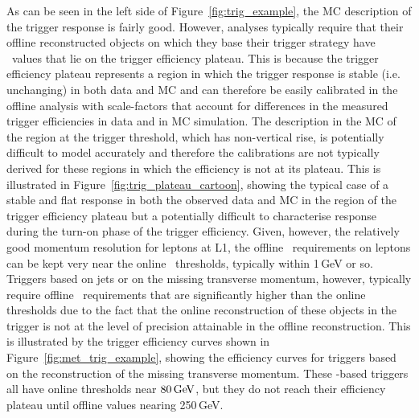 As can be seen in the left side of Figure~\ref{fig:trig_example}, the MC description of the trigger
response is fairly good.
However, analyses typically require that their offline reconstructed objects on which they base
their trigger strategy have \pT~values that lie on the trigger efficiency plateau.
This is because the trigger efficiency plateau represents a region in which the trigger response
is stable (i.e. unchanging) in both data and MC and can therefore be easily calibrated in the offline analysis
with scale-factors that account for differences in the measured trigger efficiencies in data and in MC simulation.
The description in the MC of the region at the trigger threshold, which has non-vertical rise,
is potentially difficult to model accurately and therefore the calibrations are not typically
derived for these regions in which the efficiency is not at its plateau.
This is illustrated in Figure~\ref{fig:trig_plateau_cartoon}, showing the typical case of a stable
and flat response in both the observed data and MC in the region of the trigger efficiency
plateau but a potentially difficult to characterise response during the turn-on phase of the trigger
efficiency.
Given, however, the relatively good momentum resolution for leptons at L1, the offline \pT~requirements on leptons
can be kept very near the online \pT~thresholds, typically within 1\,GeV or so.
Triggers based on jets or on the missing transverse momentum, however, typically require offline \pT~requirements
that are significantly higher than the online thresholds due to the fact that the online reconstruction of these
objects in the trigger is not at the level of precision attainable in the offline reconstruction.
This is illustrated by the trigger efficiency curves shown in Figure~\ref{fig:met_trig_example}, showing
the efficiency curves for triggers based on the reconstruction of the missing transverse momentum.
These \met-based triggers all have online thresholds near $80\,\text{Ge\kern -0.1em V}$, but they do not reach their
efficiency plateau until offline \met values nearing 250\,GeV.

